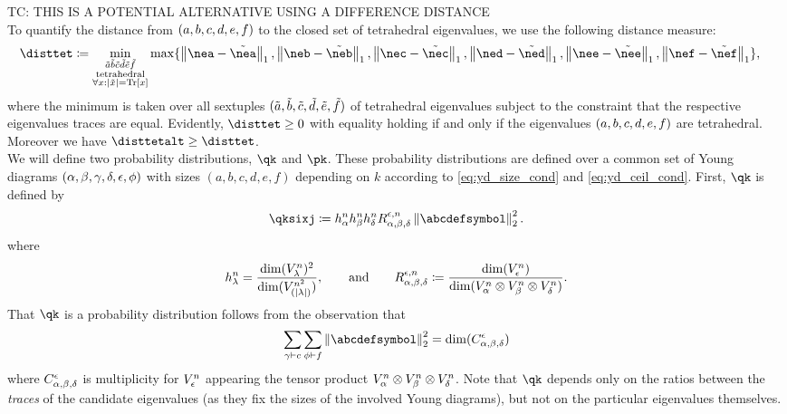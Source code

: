 \documentclass[notitlepage, 10pt]{article}
\begin{document}
\clearpage
{\color{green!50!black}
    TC: THIS IS A POTENTIAL ALTERNATIVE USING A DIFFERENCE DISTANCE \\
    To quantify the distance from $(a,b,c,d,e,f)$ to the closed set of tetrahedral eigenvalues, we use the following distance measure:
    \begin{align}
        \disttet
        &\coloneqq \min_{\substack{\tilde \ea \tilde \eb \tilde \ec\tilde\ed \tilde \ee \tilde \ef\\\mathrm{tetrahedral}\\\forall \ex : \abs{\tilde \ex}={\tex}}} 
        \max\{
            \norm{\nea - \tilde{\nea}}_{1},
            \norm{\neb - \tilde{\neb}}_{1},
            \norm{\nec - \tilde{\nec}}_{1},
            \norm{\ned - \tilde{\ned}}_{1},
            \norm{\nee - \tilde{\nee}}_{1},
            \norm{\nef - \tilde{\nef}}_{1}
        \},
    \end{align}
    where the minimum is taken over all sextuples $(\tilde{a},\tilde{b},\tilde{c},\tilde{d},\tilde{e},\tilde{f})$ of tetrahedral eigenvalues subject to the constraint that the respective eigenvalues traces are equal.
    Evidently, $\disttet \geq 0$ with equality holding if and only if the eigenvalues $(a,b,c,d,e,f)$ are tetrahedral.
    Moreover we have $\disttetalt \geq \disttet$.\\

    We will define two probability distributions, $\qk$ and $\pk$.
    These probability distributions are defined over a common set of Young diagrams $(\alpha,\beta,\gamma,\delta,\epsilon,\phi)$ with sizes $(a,b,c,d,e,f)$ depending on $k$ according to \cref{eq:yd_size_cond} and \cref{eq:yd_ceil_cond}.
    First, $\qk$ is defined by
    \begin{equation}
        \qksixj \coloneqq h^n_\ya h^n_\yb h^n_\yd R^{\ye,n}_{\ya,\yb,\yd} \norm{\abcdefsymbol}_{2}^2.
    \end{equation}
    where
    \begin{equation}
        h^{n}_\lambda = \frac{\dim(V_\lambda^n)^2}{\dim(V_{({|\lambda|})}^{n^2})}, \qquad \text{and} \qquad R^{\epsilon,n}_{\alpha,\beta,\delta}\coloneqq \frac{\dim (V_{\epsilon}^{n})}{\dim (V_{\alpha}^n\otimes V_{\beta}^{n}\otimes V_{\delta}^{n})}.
    \end{equation}
    That $\qk$ is a probability distribution follows from the observation that 
    \begin{equation}
        \sum_{\yc \vdash c}\sum_{\yf \vdash f}\norm{\abcdefsymbol}_{2}^2 = \dim(C^{\ye}_{\ya,\yb,\yd})
    \end{equation}
    where $C^{\epsilon}_{\alpha,\beta,\delta}$ is multiplicity for $V_{\epsilon}^{n}$ appearing the tensor product $V_{\alpha}^n\otimes V_{\beta}^{n}\otimes V_{\delta}^{n}$.
    Note that $\qk$ depends only on the ratios between the \textit{traces} of the candidate eigenvalues (as they fix the sizes of the involved Young diagrams), but not on the particular eigenvalues themselves.

}
\end{document}
